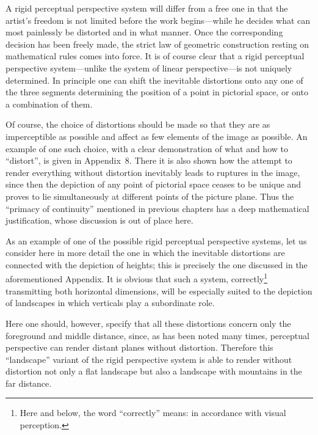 A rigid perceptual perspective system will differ from a free one in that the
artist's freedom is not limited before the work begins---while he decides what can
most painlessly be distorted and in what manner. Once the corresponding decision has
been freely made, the strict law of geometric construction resting on mathematical
rules comes into force. It is of course clear that a rigid perceptual perspective
system---unlike the system of linear perspective---is not uniquely determined. In
principle one can shift the inevitable distortions onto any one of the three segments
determining the position of a point in pictorial space, or onto a combination of
them.

Of course, the choice of distortions should be made so that they are as imperceptible
as possible and affect as few elements of the image as possible. An example of one
such choice, with a clear demonstration of what and how to ``distort'', is given in
Appendix~8. There it is also shown how the attempt to render everything without
distortion inevitably leads to ruptures in the image, since then the depiction of
any point of pictorial space ceases to be unique and proves to lie simultaneously at
different points of the picture plane. Thus the ``primacy of continuity'' mentioned
in previous chapters has a deep mathematical justification, whose discussion is out
of place here.

As an example of one of the possible rigid perceptual perspective systems, let us
consider here in more detail the one in which the inevitable distortions are
connected with the depiction of heights; this is precisely the one discussed in the
aforementioned Appendix. It is obvious that such a system, correctly\footnote{Here
  and below, the word ``correctly'' means: in accordance with visual perception.}
transmitting both horizontal dimensions, will be especially suited to the depiction
of landscapes in which verticals play a subordinate role.

Here one should, however, specify that all these distortions concern only the
foreground and middle distance, since, as has been noted many times, perceptual
perspective can render distant planes without distortion. Therefore this
``landscape'' variant of the rigid perspective system is able to render without
distortion not only a flat landscape but also a landscape with mountains in the far
distance.


